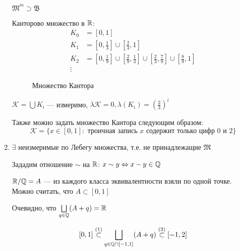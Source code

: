 \begin{enumerate}
\begin{definition}
              \(\mathfrak{M}^m\supset \mathfrak{B}\)
          \end{definition}

          \begin{example}
              Канторово множество в \(\mathbb{R}\):
              \begin{align}
                  K_0 & = [0, 1]                                                                                                                                             \\
                  K_1 & = \left[0, \frac{1}{3}\right] \cup \left[\frac{2}{3}, 1\right]                                                                                       \\
                  K_2 & = \left[0, \frac{1}{9}\right] \cup \left[\frac{2}{9}, \frac{1}{3}\right] \cup \left[\frac{2}{3}, \frac{7}{9}\right] \cup \left[\frac{8}{9}, 1\right] \\
                  \vdots
              \end{align}

              \begin{figure}[h]
                  \centering
                  
                  \caption{Множество Кантора}
              \end{figure}

              \(\mathcal{K} = \bigcup K_i\) --- измеримо, \(\lambda \mathcal{K} = 0, \lambda(K_i) = \left( \frac{2}{3} \right)^i\)

              Также можно задать множество Кантора следующим образом:
              \[\mathcal{K} = \{x\in[0, 1] : \text{ троичная запись \(x\) содержит только цифр \(0\) и \(2\)}\} \]
          \end{example}

    \item \(\exists \) неизмеримые по Лебегу множества, т.е. не принадлежащие \(\mathfrak{M}\)

          Зададим отношение \(\sim\) на \(\mathbb{R}\): \(x\sim y \Leftrightarrow x - y\in \mathbb{Q}\)

          \(\mathbb{R} / \mathbb{Q} = A\) --- из каждого класса эквивалентности взяли по одной точке. Можно считать, что \(A\subset [0, 1]\)

          Очевидно, что \(\bigsqcup\limits_{q\in\mathbb{Q}} (A + q) = \mathbb{R}\)

          \[[0, 1] \stackrel{(1)}{\subset} \bigsqcup_{q\in \mathbb{Q}\cap [ - 1, 1]}(A + q) \stackrel{(2)}{\subset} [ - 1, 2]\]


\end{enumerate}
